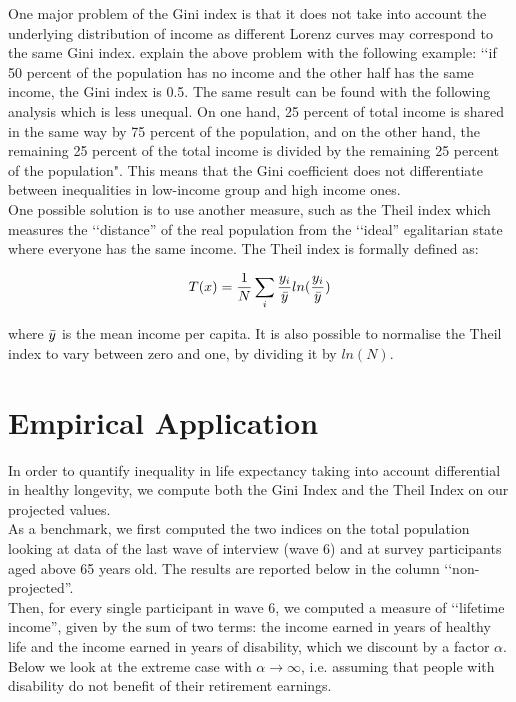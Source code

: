 One major problem of the Gini index is that it does not take into account the underlying distribution of income as different Lorenz curves may correspond to the same Gini index. \cite{Adeline2016SomeIncome} explain the above problem with the following example: \lq\lq if 50 percent of the population has no income and the other half has the same income,
the Gini index is 0.5. The same result can be found with the following analysis which is less unequal. On one hand, 25 percent of total income is shared in the same way by 75 percent of the population, and on the other hand, the remaining 25 percent of the total income is divided by the remaining 25 percent of the
population". This means that the Gini coefficient does not differentiate between inequalities in low-income group and high income ones. \\

One possible solution is to use another measure, such as the Theil index which measures the \lq\lq distance'' of the real population from the \lq\lq ideal'' egalitarian state where everyone has the same income. The Theil index is formally defined as:

\begin{equation}
    T(x) = \frac{1}{N} \sum_{i} \frac{y_i}{\Bar{y}} ln ( \frac{y_i}{\Bar{y}})
\end{equation}

where $\Bar{y}$ is the mean income per capita. It is also possible to normalise the Theil index to vary between zero and one, by dividing it by $ln(N)$. \\


\section{Empirical Application}

In order to quantify inequality in life expectancy taking into account differential in healthy longevity, we compute both the Gini Index and the Theil Index on our projected values. \\
As a benchmark, we first computed the two indices on the total population looking at data of the last wave of interview (wave 6) and at survey participants aged above 65 years old. The results are reported below in the column \lq\lq non-projected''.\\
Then, for every single participant in wave 6, we computed a measure of \lq\lq lifetime income'', given by the sum of two terms: the income earned in years of healthy life and the income earned in years of disability, which we discount by a factor $\alpha$. \\
Below we look at the extreme case with $\alpha \rightarrow \infty$, i.e. assuming that people with disability do not benefit of their retirement earnings.\\

